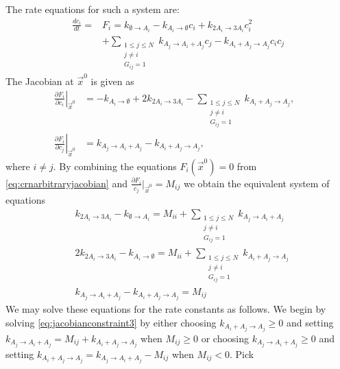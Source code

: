 The rate equations for such a system are:
\begin{equation}\label{eq:crnarbitraryjacobian}
\begin{aligned}
\frac{dc_i}{dt} = &F_i = k_{\emptyset \to A_i} - k_{A_i \to \emptyset} c_i + k_{2A_i \to 3A_i} c_i^2 \\
&+ \sum_{\substack{1 \le j \le N \\ j \neq i \\ G_{ij} = 1}} k_{A_j \to A_i + A_j} c_j - k_{A_i + A_j \to A_j} c_i c_j
\end{aligned}
\end{equation}
The Jacobian at $\vec{x}^0$ is given as
\begin{align*}
\left. \frac{\partial F_i}{\partial c_i}\right|_{\vec{x}^0} &= - k_{A_i \to \emptyset} + 2 k_{2A_i \to 3A_i} - \sum_{\substack{1 \le j \le N \\ j \neq i \\ G_{ij} = 1}} k_{A_i + A_j \rightarrow A_j}, & \\
\left. \frac{\partial F_i}{\partial c_j}\right|_{\vec{x}^0} &= k_{A_j \to A_i + A_j} - k_{A_i + A_j \to A_j}, &
\end{align*}
where $i \neq j$.
By combining the equations $F_i(\vec{x}^0) = 0$ from \ref{eq:crnarbitraryjacobian} and $\frac{\partial F_i}{c_j}|_{\vec{x}^0} = M_{ij}$ we obtain the equivalent system of equations
\begin{align}
& k_{2A_i \to 3A_i} - k_{\emptyset \to A_i} = M_{ii} + \sum_{\substack{1 \le j \le N \\ j \neq i \\ G_{ij} = 1}} k_{A_j \to A_i + A_j} \label{eq:jacobianconstraint1}  \\
& 2k_{2A_i \to 3A_i} - k_{A_i \to \emptyset} = M_{ii} + \sum_{\substack{1 \le j \le N \\ j \neq i \\ G_{ij} = 1}} k_{A_i + A_j \to A_j} \label{eq:jacobianconstraint2}\\
& k_{A_j \to A_i + A_j} - k_{A_i + A_j \to A_j} = M_{ij} \label{eq:jacobianconstraint3}
\end{align}
We may solve these equations for the rate constants as follows.  We begin by solving \ref{eq:jacobianconstraint3} by either choosing $k_{A_i + A_j \to A_j} \ge 0$ and setting $k_{A_j \to A_i + A_j} = M_{ij} + k_{A_i + A_j \to A_j}$ when $M_{ij} \ge 0$ or choosing $k_{A_j \to A_i + A_j} \ge 0$ and setting $k_{A_i + A_j \to A_j} = k_{A_j \to A_i + A_j} - M_{ij}$ when $M_{ij} < 0$.  Pick

